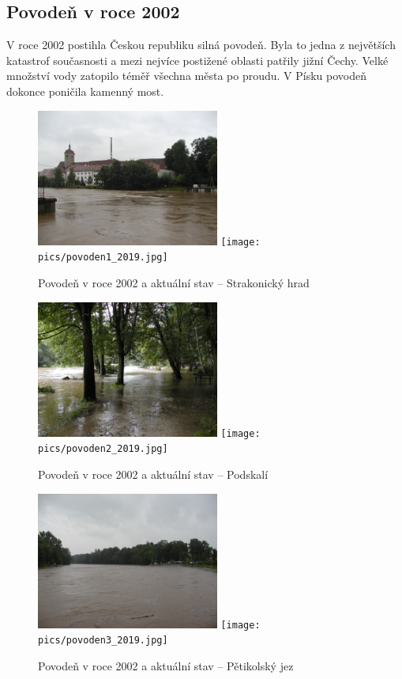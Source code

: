 \documentclass[thesis=M,czech]{FITthesis}[2012/06/26]
\begin{document}
\subsection{Povodeň v roce 2002}
V roce 2002 postihla Českou republiku silná povodeň. Byla to jedna z největších katastrof současnosti a mezi nejvíce postižené oblasti patřily jižní Čechy. Velké množství vody zatopilo téměř všechna města po proudu. V Písku povodeň dokonce poničila kamenný most. 

\begin{figure}[htp]
\centering
\includegraphics[width=6cm]{pics/povoden1.jpg}
\texttt{[image: pics/povoden1\_2019.jpg]}
\caption{Povodeň v roce 2002 a aktuální stav – Strakonický hrad}
\label{obr:povoden_hrad}
\end{figure}

\begin{figure}[h!]
\centering
\includegraphics[width=6cm]{pics/povoden2.jpg}
\texttt{[image: pics/povoden2\_2019.jpg]}
\caption{Povodeň v roce 2002 a aktuální stav – Podskalí}
\label{obr:povoden_hrad}
\end{figure}

\begin{figure}[h!]
\centering
\includegraphics[width=6cm]{pics/povoden3.jpg}
\texttt{[image: pics/povoden3\_2019.jpg]}
\caption{Povodeň v roce 2002 a aktuální stav – Pětikolský jez}
\label{obr:povoden_hrad}
\end{figure}
\end{document}
